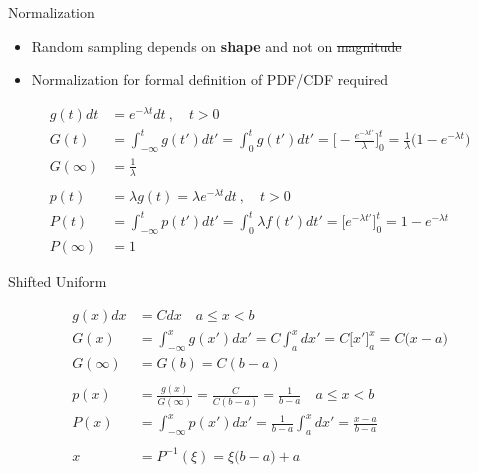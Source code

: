 \documentclass[xcolor=x11names,compress]{beamer}
\renewcommand{\(}{\begin{columns}}
\renewcommand{\)}{\end{columns}}
\newcommand{\<}[1]{\begin{column}{#1}}
\renewcommand{\>}{\end{column}}
\begin{document}
\begin{frame}{Normalization}

    \begin{itemize}
    \item Random sampling depends on \textbf{shape} and not on \sout{magnitude}
    \item Normalization for formal definition of PDF/CDF
required
    \end{itemize}
%
\[
  \begin{aligned}
g(t)dt &= e^{-\lambda t} dt \:, \quad t > 0 \\
G(t) &= \int_{-\infty}^t g(t')dt' = \int_0^t g(t') dt' = \biggl[- \frac{e^{-\lambda t'}}{\lambda} \biggr]_0^t = \frac{1}{\lambda} \bigl(1 - e^{-\lambda t}\bigr)\\
    G(\infty) &= \frac{1}{\lambda}\\
\\p(t) &= \lambda g(t) = \lambda e^{-\lambda t} dt \:, \quad t > 0 \\
    P(t) &= \int_{-\infty}^t p(t')dt' = \int_0^t \lambda f(t') dt' = \bigl[e^{-\lambda t'} \bigr]_0^t = 1 - e^{-\lambda t}\\
    P(\infty) &= 1
  \end{aligned}
\]    
    
\end{frame}


\begin{frame}{Shifted Uniform}

\[
  \begin{aligned}
g(x) dx &= C dx \quad a \leq x < b\\
G(x) &= \int_{-\infty}^x g(x')dx' = C \int_a^x dx' = C\bigl[x' \bigr]_a^x = C \bigl(x - a)\\
    G(\infty) &= G(b) = C(b-a)\\
\\p(x) &= \frac{g(x)}{G(\infty)} = \frac{C}{C(b-a)} = \frac{1}{b-a} \quad a \leq x < b\\
P(x) &= \int_{-\infty}^x p(x')dx' = \frac{1}{b-a}\int_a^x dx' = \frac{x-a}{b-a}\\
    &\\
    x &= P^{-1}(\xi) = \xi\bigl(b-a\bigr) + a
  \end{aligned}
\]    
    
\end{frame}
\end{document}
